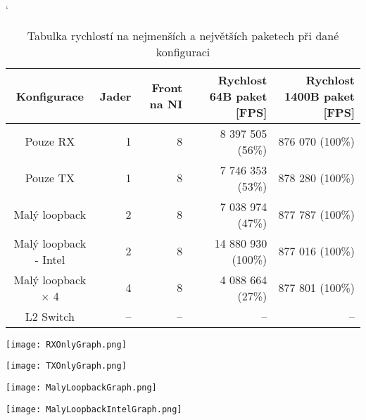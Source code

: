 \documentclass[11pt, titlepage, a4paper]{article}
\begin{document}
		\hskip-1.0cm\begin{table}[h]
		\catcode`
		\begin{adjustwidth}{-0cm}{}
		\begin{tabular}{|c|r|r|r|r|} \hline
        		\textbf{Konfigurace} &  \textbf{Jader} &  \textbf{Front na NI} & \textbf{Rychlost 64B paket [FPS]} & \textbf{Rychlost 1400B paket [FPS]}\\ \hline
      			Pouze RX & 1 & 8 & 8 397 505  (56\%) & 876 070 (100\%)\\
     			Pouze TX & 1 & 8 & 7 746 353  (53\%) & 878 280 (100\%)\\
    			Malý loopback & 2 & 8 & 7 038 974  (47\%) & 877 787 (100\%)\\
    			Malý loopback - Intel & 2 & 8 & 14 880 930 (100\%) & 877 016 (100\%)\\
    			Malý loopback $\times$ 4 & 4 & 8 & 4 088 664  (27\%) & 877 801 (100\%)\\
    			L2 Switch & -- & -- & -- & --\\
		 \end{tabular}
		\end{adjustwidth}


		  \caption{Tabulka rychlostí na nejmenších a největších paketech při dané konfiguraci}
		  \label{tab:rychlost}
		  \end{table}



		\begin{center}
		\texttt{[image: RXOnlyGraph.png]}
		\end{center}



		\begin{center}
		\texttt{[image: TXOnlyGraph.png]}
		\end{center}



		\begin{center}
		\texttt{[image: MalyLoopbackGraph.png]}
		\end{center}



		\begin{center}
		\texttt{[image: MalyLoopbackIntelGraph.png]}
		\end{center}
\end{document}
